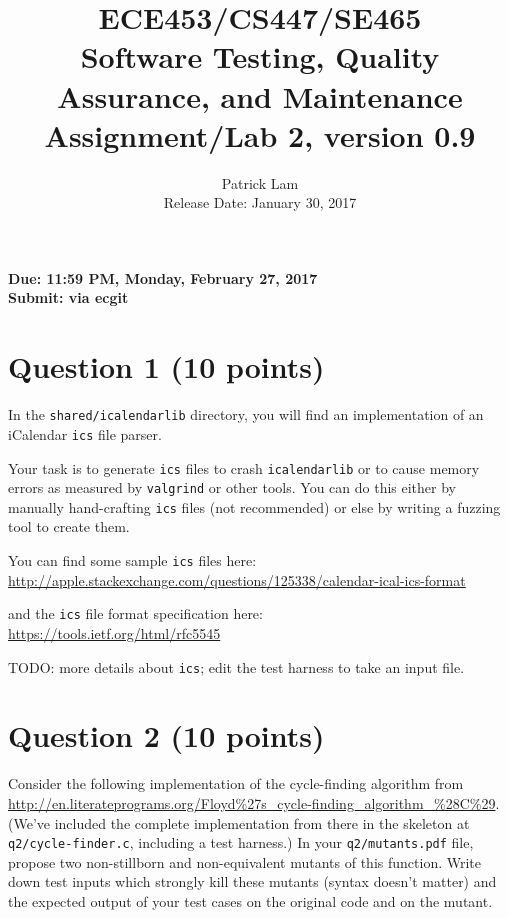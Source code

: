 \documentclass[10pt,hidelinks]{article}
\begin{document}
\title{
ECE453/CS447/SE465 \\
Software Testing, Quality Assurance, and Maintenance\\
Assignment/Lab 2, version 0.9}
\author{Patrick Lam \\
{Release Date:  January 30, 2017} \\
}
\renewcommand{\today}{}
\maketitle

\begin{center}

{\bf Due:  11:59 PM, Monday, February 27, 2017} \\
{\bf Submit: via ecgit }\\
\end{center}

\section*{Question 1 (10 points)}

In the {\tt shared/icalendarlib} directory, you will find an implementation of
an iCalendar {\tt ics} file parser.

Your task is to generate {\tt ics} files to crash {\tt icalendarlib} or to cause memory errors
as measured by {\tt valgrind} or other tools. You can do this either by manually hand-crafting
{\tt ics} files (not recommended) or else by writing a fuzzing tool to create them.

You can find some sample {\tt ics} files here:\\
\url{http://apple.stackexchange.com/questions/125338/calendar-ical-ics-format}

and the {\tt ics} file format specification here:\\
\url{https://tools.ietf.org/html/rfc5545}

TODO: more details about {\tt ics}; edit the test harness to take an input file.

\section*{Question 2 (10 points)} 

Consider the following implementation of the cycle-finding algorithm from \url{http://en.literateprograms.org/Floyd%27s_cycle-finding_algorithm_%28C%29}. (We've included the complete implementation from there in the skeleton at {\tt q2/cycle-finder.c}, including a test harness.) In your {\tt q2/mutants.pdf} file, propose two non-stillborn and non-equivalent mutants of this function. Write down test inputs which strongly kill these mutants (syntax doesn't matter) and the expected output of your test cases on the original code and on the mutant.
\end{document}
